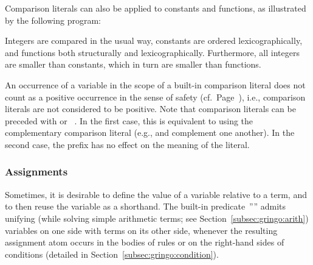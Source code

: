 \begin{example}\label{ex:symb:pred}
Comparison literals can also be applied to constants and functions,
as illustrated by the following program:%
%

%
Integers are compared in the usual way, constants are ordered lexicographically,
and functions both structurally and lexicographically.
Furthermore, all integers are smaller than constants,
which in turn are smaller than functions.
\eexample
\end{example}

\begin{note}
An occurrence of a variable in the scope of a built-in comparison literal
does not count as a positive occurrence in the sense of safety (cf.\ Page~\pageref{pg:safe}),
i.e.,
comparison literals are not considered to be positive.
Note that comparison literals can be preceded with  or ~.
In the first case, this is equivalent to using the complementary comparison literal 
(e.g., \code{<} and \code{>=} complement one another).
In the second case, the prefix has no effect on the meaning of the literal.
%
\end{note}

\subsubsection{Assignments}\label{subsec:gringo:assign}

Sometimes, it is desirable to define the value of a variable relative to a term, 
and to then reuse the variable as a shorthand.
The built-in predicate~''\code{=}'' admits unifying
(while solving simple arithmetic terms; see Section~\ref{subsec:gringo:arith})
variables on one side with terms on its other side,
whenever the resulting assignment atom occurs
in the bodies of rules or on the right-hand sides of conditions
(detailed in Section~\ref{subsec:gringo:condition}).

